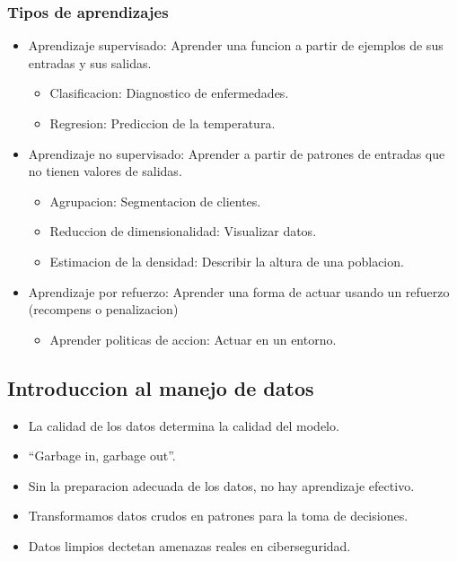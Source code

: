 \documentclass[11pt]{article}
\begin{document}
\subsubsection{Tipos de aprendizajes}
\label{sec:org89c0f34}
\begin{itemize}
\item Aprendizaje supervisado: Aprender una funcion a partir de ejemplos de sus entradas y sus salidas.
\begin{itemize}
\item Clasificacion: Diagnostico de enfermedades.
\item Regresion: Prediccion de la temperatura.
\end{itemize}
\item Aprendizaje no supervisado: Aprender a partir de patrones de entradas que no tienen valores de salidas.
\begin{itemize}
\item Agrupacion: Segmentacion de clientes.
\item Reduccion de dimensionalidad: Visualizar datos.
\item Estimacion de la densidad: Describir la altura de una poblacion.
\end{itemize}
\item Aprendizaje por refuerzo: Aprender una forma de actuar usando un refuerzo (recompens o penalizacion)
\begin{itemize}
\item Aprender politicas de accion: Actuar en un entorno.
\end{itemize}
\end{itemize}
\subsection{Introduccion al manejo de datos}
\label{sec:org631d826}
\begin{itemize}
\item La calidad de los datos determina la calidad del modelo.
\item ``Garbage in, garbage out''.
\item Sin la preparacion adecuada de los datos, no hay aprendizaje efectivo.
\item Transformamos datos crudos en patrones para la toma de decisiones.
\item Datos limpios dectetan amenazas reales en ciberseguridad.
\end{itemize}
\end{document}
